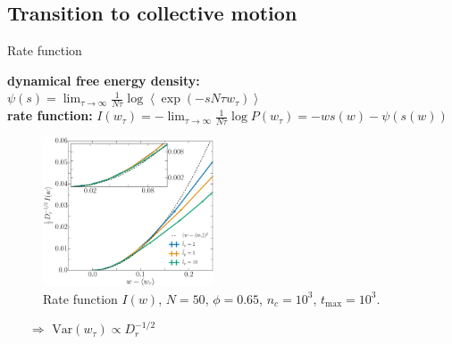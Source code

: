 \documentclass{beamer}
\begin{document}
\subsection{Transition to collective motion}

\begin{frame}{Rate function}

{\bf dynamical free energy density:} $\psi(s) = \lim_{\tau \to \infty} \frac{1}{N \tau} \log \left<\exp\left(- s N \tau w_{\tau}\right)\right>$\\
{\bf rate function:} $I(w_{\tau}) = - \lim_{\tau \to \infty} \frac{1}{N \tau} \log P(w_{\tau}) = - w s(w) - \psi(s(w))$\\

\vspace{-5pt}
\begin{figure}
\centering
\includegraphics[width=0.45\textwidth]{rate_Nm5000_Dk6500_To1000.eps}
\vspace{-5pt}
\caption{Rate function $I(w)$, $N=50$, $\phi=0.65$, $n_c = 10^3$, $t_{\mathrm{max}} = 10^3$. }
\end{figure}

\vspace{-10pt}
\begin{itemize}
  \item[$\Rightarrow$] $\mathrm{Var}(w_{\tau}) \propto D_r^{-1/2}$
\end{itemize}

\end{frame}
\end{document}
